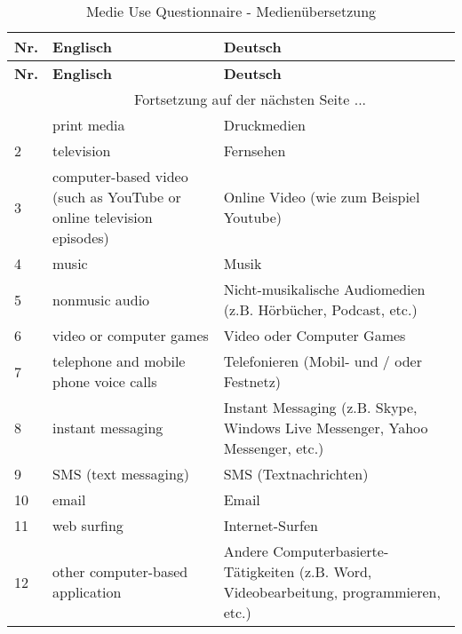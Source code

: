\begin{center}
    \begin{longtable}[t]{|l|p{6.6 cm}|p{6.6 cm}|}
    \caption{Medie Use Questionnaire - Medienübersetzung} \\ \hline
        \textbf{Nr.} & \textbf{Englisch} & \textbf{Deutsch} \\ \hline
        \endfirsthead
        \hline
        \textbf{Nr.} & \textbf{Englisch} & \textbf{Deutsch} \\ \hline
        \endhead 
        & \multicolumn{2}{|c|}{Fortsetzung auf der nächsten Seite $...$ } \\ \hline
        \endfoot
        \hline
        \endlastfoot
        1 & print media & Druckmedien \\
        2 & television & Fernsehen \\
        3 & computer-based video (such as YouTube or online television episodes) & Online Video (wie zum Beispiel Youtube) \\
        4 & music & Musik \\
        5 & nonmusic audio & Nicht-musikalische Audiomedien (z.B. Hörbücher, Podcast, etc.) \\
        6 & video or computer games & Video oder Computer Games \\
        7 & telephone and mobile phone voice calls & Telefonieren (Mobil- und / oder Festnetz) \\
        8 & instant messaging & Instant Messaging (z.B. Skype, Windows Live Messenger, Yahoo Messenger, etc.) \\
        9 & SMS (text messaging) & SMS (Textnachrichten) \\
        10 & email & Email \\
        11 & web surfing & Internet-Surfen \\
        12 & other computer-based application  & Andere Computerbasierte-Tätigkeiten (z.B. Word, Videobearbeitung, programmieren, etc.) \\
        \end{longtable}
	\label{tab.muqUebersetzung}
\end{center}


